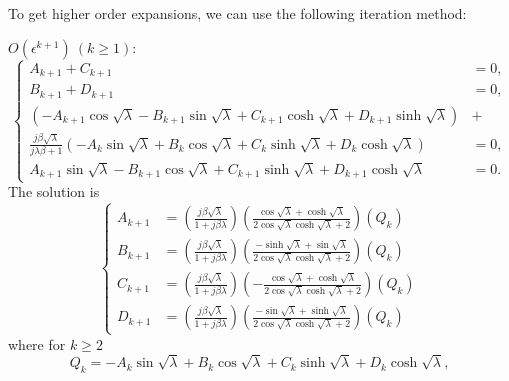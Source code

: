 \documentclass{article}
\begin{document}
To get higher order expansions, we can use the following iteration method:

\noindent
$O(\epsilon^{k+1})\ (k\geq 1)$:
\begin{equation}
    \left\{\begin{aligned}
        A_{k+1} + C_{k+1} &= 0, \\
        B_{k+1} + D_{k+1} &= 0, \\
        \left( - A_{k+1} \cos{\sqrt{\lambda}} - B_{k+1} \sin{\sqrt{\lambda}} + C_{k+1} \cosh{\sqrt{\lambda}} + D_{k+1} \sinh{\sqrt{\lambda}} \right) &+ \\
        \frac{j \beta \sqrt{\lambda}}{ j\lambda \beta + 1 } \left( - A_{k} \sin{\sqrt{\lambda}} + B_{k} \cos{\sqrt{\lambda}} + C_{k} \sinh{\sqrt{\lambda}} + D_{k} \cosh{\sqrt{\lambda}} \right) &= 0, \\
        A_{k+1} \sin{\sqrt{\lambda}} - B_{k+1} \cos{\sqrt{\lambda}} + C_{k+1} \sinh{\sqrt{\lambda}} + D_{k+1} \cosh{\sqrt{\lambda}} &= 0.
    \end{aligned}\right.
\end{equation}
The solution is
\begin{equation}
    \left\{\begin{aligned}
        A_{k+1} &= \left( \frac{j \beta \sqrt{\lambda }}{1+j \beta \lambda } \right) \left(\frac{\cos\sqrt{\lambda }+\cosh\sqrt{\lambda }}{2 \cos\sqrt{\lambda }\cosh\sqrt{\lambda }+2} \right) \left( Q_k \right) \\
        B_{k+1} &= \left( \frac{j \beta \sqrt{\lambda }}{1+j \beta \lambda } \right) \left( \frac{-\sinh\sqrt{\lambda }+\sin\sqrt{\lambda }}{2 \cos\sqrt{\lambda }\cosh\sqrt{\lambda }+2} \right) \left( Q_k \right) \\
        C_{k+1} &= \left( \frac{j \beta \sqrt{\lambda }}{1+j \beta \lambda } \right) \left( -\frac{\cos\sqrt{\lambda }+\cosh\sqrt{\lambda }}{2 \cos\sqrt{\lambda } \cosh\sqrt{\lambda }+2} \right) \left( Q_k \right) \\
        D_{k+1} &= \left( \frac{j \beta \sqrt{\lambda }}{1+j \beta \lambda } \right) \left( \frac{-\sin\sqrt{\lambda }+\sinh\sqrt{\lambda }}{2 \cos\sqrt{\lambda }\cosh\sqrt{\lambda }+2} \right) \left( Q_k \right) 
    \end{aligned}\right.
\end{equation}
where for $k \geq 2$
\begin{equation}
    Q_k = - A_{k} \sin{\sqrt{\lambda}} + B_{k} \cos{\sqrt{\lambda}} + C_{k} \sinh{\sqrt{\lambda}} + D_{k} \cosh{\sqrt{\lambda}},
\end{equation}
\end{document}
